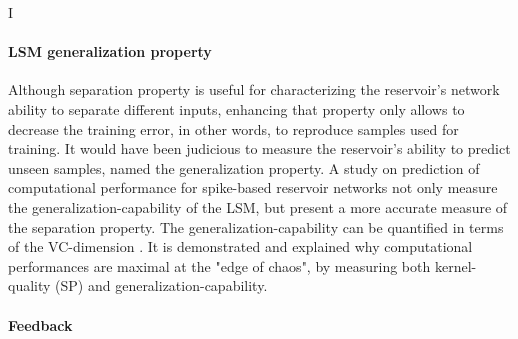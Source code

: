 \documentclass[11pt, a4paper]{article} %
\begin{document}
I%

\paragraph{LSM generalization property}

Although separation property is useful for characterizing the reservoir's network ability to separate different inputs, enhancing that property only allows to decrease the training error, in other words, to reproduce samples used for training. It would have been judicious to measure the reservoir's ability to predict unseen samples, named the generalization property. A study on prediction of computational performance for spike-based reservoir networks \cite{legenstein2007edge} not only measure the generalization-capability of the LSM, but present a more accurate measure of the separation property. The generalization-capability can be quantified in terms of the VC-dimension \cite{vapnikn}. It is demonstrated and explained why computational performances are maximal  at the "edge of chaos", by measuring both kernel-quality (SP) and generalization-capability.

\paragraph{Feedback}
\end{document}
